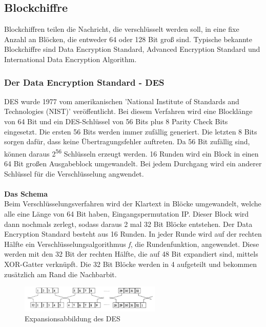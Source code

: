 \documentclass[11pt]{scrartcl}
\begin{document}
\subsection{Blockchiffre}
\label{sec:blockchiffre}
Blockchiffren teilen die Nachricht, die verschlüsselt werden soll, in eine fixe Anzahl an Blöcken, die entweder 64 oder 128 Bit groß sind. Typische bekannte Blockchiffre sind Data Encryption Standard, Advanced Encryption Standard und International Data Encryption Algorithm. \cite{1}
\subsubsection{Der Data Encryption Standard - DES}
\label{sec:data-encryotion-standard}
\grqq{}DES wurde 1977 vom amerikanischen 'National Institute of Standards and Technologies (NIST)' veröffentlicht.\grqq{}\cite{1} Bei diesem Verfahren wird eine Blocklänge von 64 Bit und ein DES-Schlüssel von 56 Bits plus 8 \grqq{}Parity Check Bits\grqq{}\cite{1} eingesetzt. Die ersten 56 Bits werden immer zufällig generiert. Die letzten 8 Bits sorgen dafür, dass keine Übertragungsfehler auftreten. Da 56 Bit zufällig sind, können daraus 2\textsuperscript{56} Schlüsseln erzeugt werden. 16 Runden wird ein Block in einen 64 Bit großen Ausgabeblock umgewandelt. Bei jedem Durchgang wird ein anderer Schlüssel für die Verschlüsselung angwendet. \cite{1}\cite{4}\\\\
\noindent \textbf{Das Schema}\\
Beim Verschlüsselungsverfahren wird der Klartext in Blöcke umgewandelt, welche alle eine Länge von 64 Bit haben, Eingangspermutation IP. Dieser Block wird dann nochmals zerlegt, sodass daraus 2 mal 32 Bit Blöcke entstehen. Der Data Encryption Standard besteht aus 16 Runden. In jeder Runde wird auf der rechten Hälfte ein Verschlüsselungsalgorithmus \textit{f}, die Rundenfunktion, angewendet. Diese werden mit den 32 Bit der rechten Hälfte, die auf 48 Bit expandiert sind, mittels XOR-Gatter verknüpft. Die 32 Bit Blöcke werden in 4 aufgeteilt und bekommen zusätzlich am Rand die Nachbarbit. \cite{2}\\
\begin{figure}[H]
\includegraphics[width=0.60\textwidth]{Bilder/DES/DES_Expansionsabbildung}
	\caption{Expansionsabbildung des DES \cite{2}}
	\label{fig1}
\end{figure}
\end{document}
